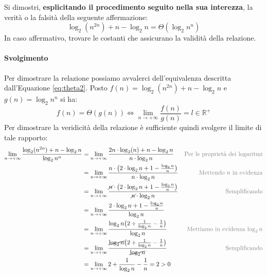 \begin{exsbox}
	Si dimostri, \textbf{esplicitando il procedimento seguito nella sua interezza}, la verità o la falsità della seguente affermazione: \begin{displaymath}
		\log_{2}(n^{2n}) + n - \log_{2} n  = \Theta(\log_{2} n^{n})
	\end{displaymath}
	In caso affermativo, trovare le costanti che assicurano la validità della relazione.
\end{exsbox}

\paragraph{Svolgimento}
Per dimostrare la relazione possiamo avvalerci dell'equivalenza descritta dall'Equazione \ref{eq:theta2}. Posto $f(n) = \log_{2}(n^{2n}) + n - \log_{2} n$ e $g(n) = \log_{2} n^{n}$ si ha:
\begin{displaymath}
	f(n) = \Theta(g(n)) \iff \lim_{n \to +\infty} \frac{f(n)}{g(n)} = l \in \mathbb{R^{+}}
\end{displaymath}
Per dimostrare la veridicità della relazione è sufficiente quindi svolgere il limite di tale rapporto:
\begin{align*}
	\lim_{n \to +\infty} \frac{\log_{2}(n^{2n}) + n - \log_{2} n}{\log_{2} n^{n}} &= \lim_{n \to +\infty} \frac{2n \cdot \log_{2}(n) + n - \log_{2} n}{n \cdot \log_{2} n} & \text{\textcolor{gray}{Per le proprietà dei logaritmi}}\\
	&= \lim_{n \to +\infty} \frac{n \cdot \bigl(2 \cdot \log_{2}n + 1 - \frac{\log_{2} n}{n}\bigr)}{n \cdot \log_{2} n} & \text{\textcolor{gray}{Mettendo $n$ in evidenza}}\\
	&= \lim_{n \to +\infty} \frac{\cancel{n} \cdot \bigl(2 \cdot \log_{2}n + 1 - \frac{\log_{2} n}{n}\bigr)}{\cancel{n} \cdot \log_{2} n} & \text{\textcolor{gray}{Semplificando}}\\
	&= \lim_{n \to +\infty} \frac{2 \cdot \log_{2}n + 1 - \frac{\log_{2} n}{n}}{\log_{2} n}\\
	&= \lim_{n \to +\infty} \frac{\log_{2} n \bigl( 2 + \frac{1}{\log_{2 }n} - \frac{1}{n}\bigr)}{\log_{2} n}   & \text{\textcolor{gray}{Mettiamo in evidenza $\log_{2} n$}}\\
	&= \lim_{n \to +\infty} \frac{\cancel{\log_{2} n} \bigl(2 + \frac{1}{\log_{2}n} - \frac{1}{n}\bigr)}{\cancel{\log_{2} n}} & \text{\textcolor{gray}{Semplificando}} \\
	&= \lim_{n \to +\infty} 2 + \frac{1}{\log_{2}n} - \frac{1}{n} = 2 > 0
\end{align*}

